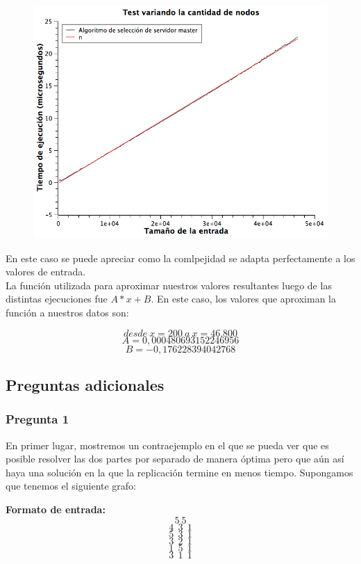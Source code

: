 \begin{figure}[H]
	\includegraphics[width=350pt]{../tests/ej2/EJ2-nodo-var.png}
\end{figure}

En este caso se puede apreciar como la comlpejidad se adapta perfectamente a los valores de entrada.\\
La función utilizada para aproximar nuestros valores resultantes luego de las distintas ejecuciones fue $A*x+B$.
En este caso, los valores que aproximan la función a nuestros datos son:

$$desde\ x = 200\ a\ x = 46.800$$
$$A  = 0,000480693152246956$$
$$B  = -0,176228394042768$$


\subsection{Preguntas adicionales}

\subsubsection{Pregunta 1}
En primer lugar, mostremos un contraejemplo en el que se pueda ver que es posible resolver las dos partes por separado de manera óptima pero que aún así haya una solución en la que la replicación termine en menos tiempo.\newline
\newline
Supongamos que tenemos el siguiente grafo:\newline

\textbf{Formato de entrada:}
$$5\ 5$$
$$4\ \ 3\ \ 1$$
$$5\ \ 3\ \ 1$$
$$3\ \ 2\ \ 1$$
$$1\ \ 5\ \ 1$$
$$3\ \ 1\ \ 1$$

